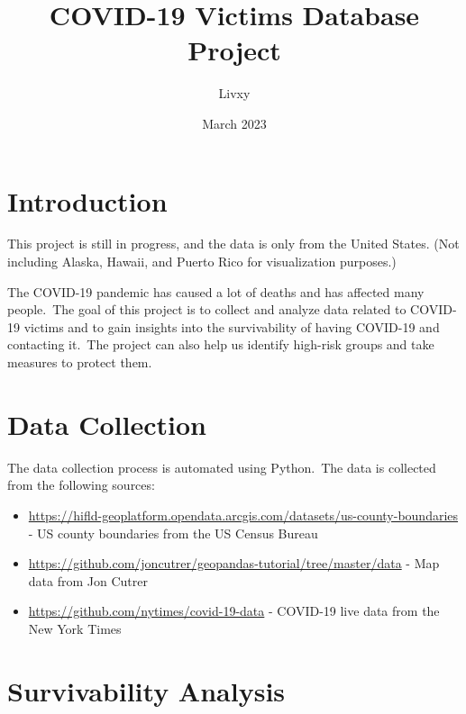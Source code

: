 \documentclass{article}
\begin{document}
\title{COVID-19 Victims Database Project}
\author{Livxy}
\date{March 2023}

\maketitle
\thispagestyle{empty}
\vspace{50cm}
\setlength{\columnsep}{14pt}


\section{Introduction}
\begin{boxH}
	This project is still in progress, and the data is only from the United States. (Not including Alaska, Hawaii, and Puerto Rico for visualization purposes.)
\end{boxH}

\indent

The COVID-19 pandemic has caused a lot of deaths and has affected many people.\
The goal of this project is to collect and analyze data related to COVID-19 victims and to gain insights into the survivability of having COVID-19 and contacting it.\
The project can also help us identify high-risk groups and take measures to protect them.


\section{Data Collection}
\indent

The data collection process is automated using Python.\
The data is collected from the following sources: \
\begin{itemize}
	\item \cite{census} \url{https://hifld-geoplatform.opendata.arcgis.com/datasets/us-county-boundaries} - US county boundaries from the US Census Bureau
	\item \cite{cutrer} \url{https://github.com/joncutrer/geopandas-tutorial/tree/master/data} - Map data from Jon Cutrer
	\item \cite{nytimes} \url{https://github.com/nytimes/covid-19-data} - COVID-19 live data from the New York Times
\end{itemize}



\section{Survivability Analysis}
\end{document}
